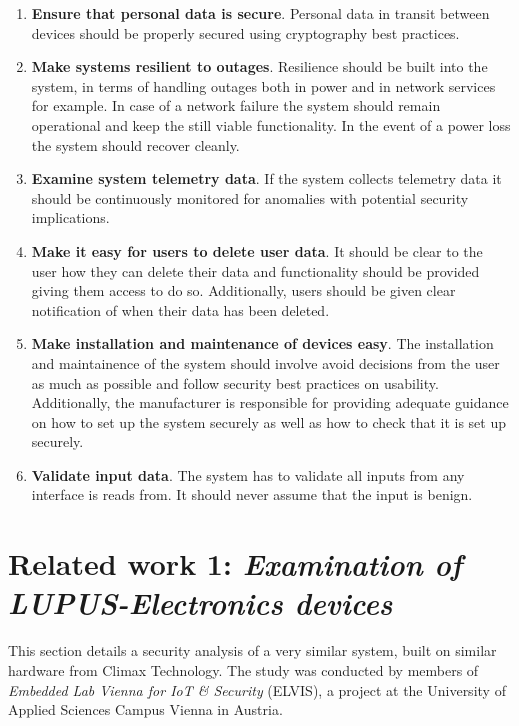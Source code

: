 \begin{enumerate}
    \item \textbf{Ensure that personal data is secure}. Personal data in transit between devices should be properly secured using cryptography best practices.
    
    \item \textbf{Make systems resilient to outages}. Resilience should be built into the system, in terms of handling outages both in power and in network services for example. In case of a network failure the system should remain operational and keep the still viable functionality. In the event of a power loss the system should recover cleanly.
    
    \item \textbf{Examine system telemetry data}. If the system collects telemetry data it should be continuously monitored for anomalies with potential security implications.
    
    \item \textbf{Make it easy for users to delete user data}. It should be clear to the user how they can delete their data and functionality should be provided giving them access to do so. Additionally, users should be given clear notification of when their data has been deleted.
    
    \item \textbf{Make installation and maintenance of devices easy}. The installation and maintainence of the system should involve avoid decisions from the user as much as possible and follow security best practices on usability. Additionally, the manufacturer is responsible for providing adequate guidance on how to set up the system securely as well as how to check that it is set up securely.
    
    \item \textbf{Validate input data}. The system has to validate all inputs from any interface is reads from. It should never assume that the input is benign.
\end{enumerate}

\section{Related work 1: \textit{Examination of LUPUS-Electronics devices}} \label{ch:related-work:lupus}
This section details a security analysis of a very similar system, built on similar hardware from Climax Technology. The study was conducted by members of \textit{Embedded Lab Vienna for IoT \& Security} (ELVIS), a project at the University of Applied Sciences Campus Vienna in Austria.

